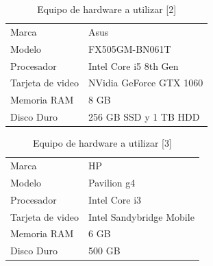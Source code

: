 \documentclass[12pt, a4paper, titlepage]{report}
\begin{document}
    				\begin{table}[H]
        				\begin{tabular}{ |p{3.5cm}||p{9.5cm}|}
        					\hline
        					\rowcolor{guindapoli}
        					\multicolumn{2}{|c|}{\textbf{\textcolor{white}{Equipo de hardware [2]}}}\\
        					\hline
        					\rowcolor{azulfuerte}Marca & Asus\\
        					\hline
        					\cellcolor{azulclaro}Modelo & FX505GM-BN061T\\ 
        					\hline
        					\cellcolor{azulclaro}Procesador &
        					Intel Core i5 8th Gen\\
        					\hline
        					\cellcolor{azulclaro}Tarjeta de video & 
        					NVidia GeForce GTX 1060\\
        					\hline
        					\cellcolor{azulclaro}Memoria RAM &
        					8 GB\\
        					\hline
        					\cellcolor{azulclaro}Disco Duro &
        					256 GB SSD y 1 TB HDD\\
        					\hline
        				\end{tabular}
    				\caption[Equipo de Hardware 2]{Equipo de hardware a utilizar [2]}
    				\end{table}
    				\begin{table}[H]
        				\begin{tabular}{ |p{3.5cm}||p{9.5cm}|}
        					\hline
        					\rowcolor{guindapoli}
        					\multicolumn{2}{|c|}{\textbf{\textcolor{white}{Equipo de hardware [3]}}}\\
        					\hline
        					\rowcolor{azulfuerte}Marca & HP\\
        					\hline
        					\cellcolor{azulclaro}Modelo & Pavilion g4\\ 
        					\hline
        					\cellcolor{azulclaro}Procesador &
        					Intel Core i3\\
        					\hline
        					\cellcolor{azulclaro}Tarjeta de video & 
        					Intel Sandybridge Mobile\\
        					\hline
        					\cellcolor{azulclaro}Memoria RAM &
        					6 GB\\
        					\hline
        					\cellcolor{azulclaro}Disco Duro &
        					500 GB\\
        					\hline
        				\end{tabular}
    				\caption[Equipo de Hardware 3]{Equipo de hardware a utilizar [3]}
    				\end{table}
\end{document}
